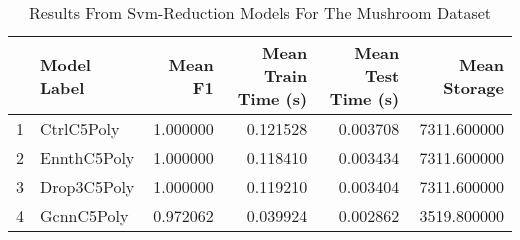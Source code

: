 \begin{table}[!htbp]
\centering
\caption{Results From Svm-Reduction Models For The Mushroom Dataset}
\label{tab:svm_reduction_results_mushroom}
\begin{tabular}{rlrrrr}
\toprule
 & Model Label & Mean F1 & Mean Train Time (s) & Mean Test Time (s) & Mean Storage \\
\midrule
1 & CtrlC5Poly & 1.000000 & 0.121528 & 0.003708 & 7311.600000 \\
2 & EnnthC5Poly & 1.000000 & 0.118410 & 0.003434 & 7311.600000 \\
3 & Drop3C5Poly & 1.000000 & 0.119210 & 0.003404 & 7311.600000 \\
4 & GcnnC5Poly & 0.972062 & 0.039924 & 0.002862 & 3519.800000 \\
\bottomrule
\end{tabular}
\end{table}

